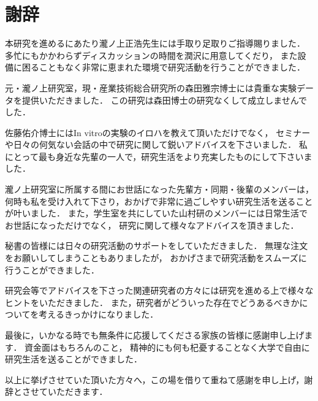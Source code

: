 \chapter*{謝辞}

本研究を進めるにあたり瀧ノ上正浩先生には手取り足取りご指導賜りました．
多忙にもかかわらずディスカッションの時間を潤沢に用意してくだり，
また設備に困ることもなく非常に恵まれた環境で研究活動を行うことができました．

元・瀧ノ上研究室，現・産業技術総合研究所の森田雅宗博士には貴重な実験データを提供いただきました．
この研究は森田博士の研究なくして成立しませんでした．

佐藤佑介博士にはIn vitroの実験のイロハを教えて頂いただけでなく，
セミナーや日々の何気ない会話の中で研究に関して鋭いアドバイスを下さいました．
私にとって最も身近な先輩の一人で，研究生活をより充実したものにして下さいました．

瀧ノ上研究室に所属する間にお世話になった先輩方・同期・後輩のメンバーは，
何時も私を受け入れて下さり，おかげで非常に過ごしやすい研究生活を送ることが叶いました．
また，学生室を共にしていた山村研のメンバーには日常生活でお世話になっただけでなく，
研究に関して様々なアドバイスを頂きました．

秘書の皆様には日々の研究活動のサポートをしていただきました．
無理な注文をお願いしてしまうこともありましたが，
おかげさまで研究活動をスムーズに行うことができました．

研究会等でアドバイスを下さった関連研究者の方々には研究を進める上で様々なヒントをいただきました．
また，研究者がどういった存在でどうあるべきかについてを考えるきっかけになりました．

最後に，いかなる時でも無条件に応援してくださる家族の皆様に感謝申し上げます．
資金面はもちろんのこと，
精神的にも何も杞憂することなく大学で自由に研究生活を送ることができました．

以上に挙げさせていた頂いた方々へ，この場を借りて重ねて感謝を申し上げ，謝辞とさせていただきます．
